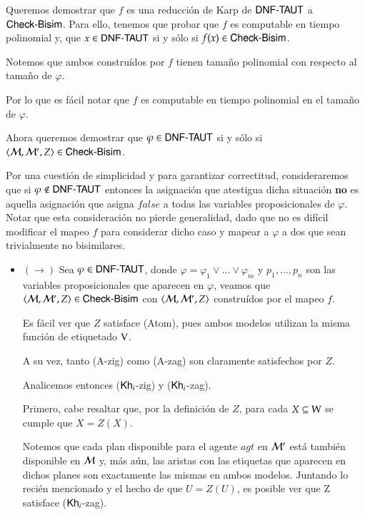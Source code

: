 \begin{demostracion}
    Queremos demostrar que $f$ es una reducción de Karp de $\rm\textsf{DNF-TAUT}$ a $\rm\textsf{Check-Bisim}$. Para ello, tenemos que probar que $f$ es computable 
    en tiempo polinomial y, que $x \in \rm\textsf{DNF-TAUT}$ si y sólo si $f(x) \in \rm\textsf{Check-Bisim}$.

    Notemos que ambos \ultss construídos por $f$ tienen tamaño polinomial con respecto al tamaño de $\varphi$.

    Por lo que es fácil notar que $f$ es computable en tiempo polinomial en el tamaño de $\varphi$.

    Ahora queremos demostrar que $\varphi \in \rm\textsf{DNF-TAUT}$ si y sólo si $\langle \mathcal{M},\mathcal{M}',Z \rangle \in \rm\textsf{Check-Bisim}$.

    Por una cuestión de simplicidad y para garantizar correctitud, consideraremos que si $\varphi \not\in \rm\textsf{DNF-TAUT}$ entonces la asignación 
    que atestigua dicha situación \textbf{no} es aquella asignación que asigna $false$ a todas las variables proposicionales de $\varphi$. 
    Notar que esta consideración no pierde generalidad, dado que no es difícil modificar el mapeo $f$ para considerar dicho caso y 
    mapear a $\varphi$ a dos \ultss que sean trivialmente no bisimilares.  

    \begin{itemize}
    
    \item $(\rightarrow)$ Sea $\varphi \in \rm\textsf{DNF-TAUT}$, donde $\varphi = \varphi_1 \vee ... \vee \varphi_m$ y $p_1,...,p_n$ 
    son las variables proposicionales que aparecen en $\varphi$, veamos que $\langle \mathcal{M},\mathcal{M}',Z \rangle \in \rm\textsf{Check-Bisim}$ con 
    $\langle \mathcal{M},\mathcal{M}',Z \rangle$ construídos por el mapeo $f$.

    Es fácil ver que $Z$ satisface (Atom), pues ambos modelos utilizan la misma función de etiquetado $\mathrm{V}$.

    A su vez, tanto (A-zig) como (A-zag) son claramente satisfechos por $Z$.

    Analicemos entonces ($\mathsf{Kh}_i$-zig) y ($\mathsf{Kh}_i$-zag).

    Primero, cabe resaltar que, por la definición de $Z$, para cada $X \subseteq \mathrm{W}$ se cumple que $X = Z(X)$.

    Notemos que cada plan disponible para el agente $agt$ en $\mathcal{M}'$ está también disponible en $\mathcal{M}$ y, más aún, 
    las aristas con las etiquetas que aparecen en dichos planes son exactamente las mismas en ambos modelos. Juntando lo recién 
    mencionado y el hecho de que $U = Z(U)$, es posible ver que Z satisface ($\mathsf{Kh}_i$-zag).


\end{itemize}
\end{demostracion}
